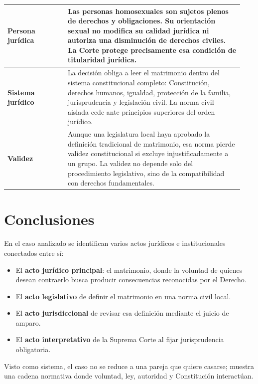 \documentclass[
	spanish,
	letterpaper, oneside
]{article}
\begin{document}
\begin{landscape}
\begin{longtable}{@{}p{0.24\linewidth}p{0.70\linewidth}@{}}
\textbf{Persona jurídica} &
Las personas homosexuales son sujetos plenos de derechos y obligaciones. Su orientación sexual no modifica su calidad jurídica ni autoriza una disminución de derechos civiles. La Corte protege precisamente esa condición de titularidad jurídica. \\
\midrule

\textbf{Sistema jurídico} &
La decisión obliga a leer el matrimonio dentro del sistema constitucional completo: Constitución, derechos humanos, igualdad, protección de la familia, jurisprudencia y legislación civil. La norma civil aislada cede ante principios superiores del orden jurídico. \\
\midrule

\textbf{Validez} &
Aunque una legislatura local haya aprobado la definición tradicional de matrimonio, esa norma pierde validez constitucional si excluye injustificadamente a un grupo. La validez no depende solo del procedimiento legislativo, sino de la compatibilidad con derechos fundamentales. \\

\end{longtable}
\endgroup
\end{landscape}
\clearpage
\pagestyle{fancy}

\section{Conclusiones}

En el caso analizado se identifican varios actos jurídicos e institucionales conectados entre sí:

\begin{itemize}
  \item El \textbf{acto jurídico principal}: el matrimonio, donde la voluntad de quienes desean contraerlo busca producir consecuencias reconocidas por el Derecho.
  \item El \textbf{acto legislativo} de definir el matrimonio en una norma civil local.
  \item El \textbf{acto jurisdiccional} de revisar esa definición mediante el juicio de amparo.
  \item El \textbf{acto interpretativo} de la Suprema Corte al fijar jurisprudencia obligatoria.
\end{itemize}

Visto como sistema, el caso no se reduce a una pareja que quiere casarse; muestra una cadena normativa donde voluntad, ley, autoridad y Constitución interactúan.
\end{document}
